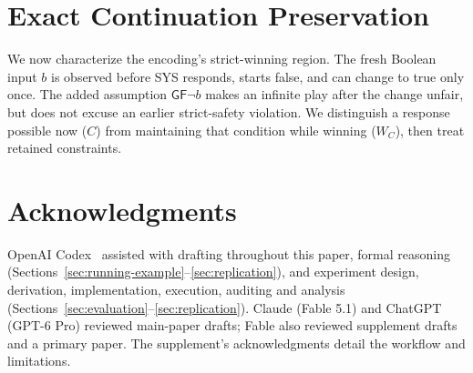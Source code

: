 \documentclass[conference,10pt]{IEEEtran}
\newcommand{\G}{\mathsf{G}}\newcommand{\F}{\mathsf{F}}
\begin{document}

\section{Exact Continuation Preservation}\label{sec:formal}
We now characterize the encoding's strict-winning region. The fresh
Boolean input $b$ is observed before SYS responds, starts false, and can
change to true only once. The added assumption $\G\F\neg b$ makes an
infinite play after the change unfair, but does not excuse an earlier
strict-safety violation. We distinguish a response possible now ($C$) from maintaining
that condition while winning ($W_C$), then treat retained constraints.







\section*{Acknowledgments}
OpenAI Codex~\cite{codex} assisted with drafting throughout this paper,
formal reasoning (Sections~\ref{sec:running-example}--\ref{sec:replication}),
and experiment design, derivation, implementation, execution, auditing
and analysis (Sections~\ref{sec:evaluation}--\ref{sec:replication}).
Claude (Fable 5.1) and ChatGPT (GPT-6 Pro) reviewed main-paper drafts;
Fable also reviewed supplement drafts and a primary paper. The
supplement's acknowledgments detail the workflow and limitations.

\clearpage
\nobalance
{}

\end{document}
